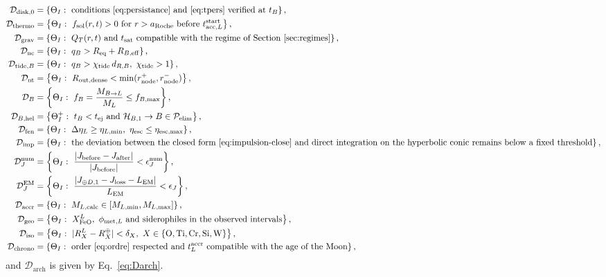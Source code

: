 \documentclass[11pt,a4paper,openany]{report}
\newcommand{\Req}{R_{\mathrm{eq}}}
\newcommand{\aR}{a_{\mathrm{Roche}}}
\begin{document}
\begin{align}
\mathcal{D}_{\mathrm{disk},0}&=\left\{\Theta_I:\ \text{conditions~\eqref{eq:persistance} and~\eqref{eq:tpers} verified at }t_B\right\},
\label{eq:Ddisque}\\
\mathcal{D}_{\mathrm{thermo}}&=\left\{\Theta_I:\ f_{\mathrm{sol}}(r,t)>0\ \text{for }r>\aR\ \text{before }
t^{\mathrm{start}}_{\mathrm{acc},L}\right\},
\label{eq:Dthermo}\\
\mathcal{D}_{\mathrm{grav}}&=\left\{\Theta_I:\ Q_T(r,t)\ \text{and}\ t_{\mathrm{sat}}\ \text{compatible with the regime of Section~\ref{sec:regimes}}\right\},
\label{eq:Dgrav}\\
\mathcal{D}_{\mathrm{nc}}&=\left\{\Theta_I:\ q_B>\Req+R_{B,\mathrm{eff}}\right\},
\label{eq:Dnc}\\
\mathcal{D}_{\mathrm{tide},B}&=\left\{\Theta_I:\ q_B>\chi_{\mathrm{tide}}\,d_{R,B},\ \chi_{\mathrm{tide}}>1\right\},
\label{eq:DtideB}\\
\mathcal{D}_{\mathrm{nt}}&=\left\{\Theta_I:\ R_{\mathrm{out,dense}}<\min(r^{+}_{\text{node}},r^{-}_{\text{node}})\right\},
\label{eq:Dnt}\\
\mathcal{D}_{B}&=\left\{\Theta_I:\ f_B=\frac{M_{B\to L}}{M_L}\le f_{B,\max}\right\},
\label{eq:DB}\\
\mathcal{D}_{B,\mathrm{hel}}&=\left\{\Theta_I^{+}:\ t_B<t_{\mathrm{ej}}
\text{ and }\mathcal{H}_{B,1}\to B\in\mathcal{P}_{\mathrm{elim}}\right\},
\label{eq:DBhel}\\
\mathcal{D}_{\mathrm{fen}}&=\left\{\Theta_I:\ \Delta\eta_L\ge\eta_{L,\min},\ \eta_{\mathrm{esc}}\le\eta_{\mathrm{esc},\max}\right\},
\label{eq:Dfen}\\
\mathcal{D}_{\mathrm{imp}}&=\left\{\Theta_I:\ \text{the deviation between the closed
form~\eqref{eq:impulsion-close} and direct integration on the hyperbolic conic remains below a fixed
threshold}\right\},
\label{eq:Dimp}\\
\mathcal{D}_{J}^{\mathrm{num}}&=\left\{\Theta_I:\ \frac{|J_{\mathrm{before}}-J_{\mathrm{after}}|}{|J_{\mathrm{before}}|}<\epsilon_J^{\mathrm{num}}\right\},
\label{eq:DJ}\\
\mathcal{D}_{J}^{\mathrm{EM}}&=\left\{\Theta_I:\ \frac{|J_{\oplus D,1}-J_{\mathrm{loss}}-L_{\mathrm{EM}}|}{L_{\mathrm{EM}}}<\epsilon_J\right\},
\label{eq:DJEM}\\
\mathcal{D}_{\mathrm{accr}}&=\left\{\Theta_I:\ M_{L,\mathrm{calc}}\in[M_{L,\min},M_{L,\max}]\right\},
\label{eq:Daccr}\\
\mathcal{D}_{\mathrm{geo}}&=\left\{\Theta_I:\ X^L_{\mathrm{FeO}},\ \phi_{\mathrm{met},L}\ \text{and siderophiles in the observed intervals}\right\},
\label{eq:Dgeo}\\
\mathcal{D}_{\mathrm{iso}}&=\left\{\Theta_I:\ |R_X^L-R_X^\oplus|<\delta_X,\ X\in\{\mathrm{O},\mathrm{Ti},\mathrm{Cr},\mathrm{Si},\mathrm{W}\}\right\},
\label{eq:Diso}\\
\mathcal{D}_{\mathrm{chrono}}&=\left\{\Theta_I:\ \text{order~\eqref{eq:ordre} respected and }
t^{\mathrm{accr}}_L\ \text{compatible with the age of the Moon}\right\},
\label{eq:Dchrono}
\end{align}
and $\mathcal{D}_{\mathrm{arch}}$ is given by Eq.~\eqref{eq:Darch}.
\end{document}
